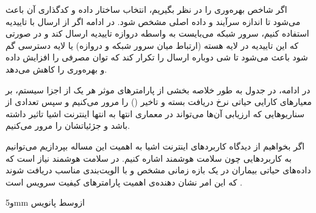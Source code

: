 اگر شاخص بهره‌وری را در نظر بگیریم، انتخاب ساختار داده و کدگذاری آن باعث می‌شود تا اندازه سرآیند و داده اصلی مشخص شود.
در ادامه اگر از ارسال با تاییدیه استفاده کنیم، سرور شبکه می‌بایست به واسطه دروازه تاییدیه ارسال کند و در صورتی
که این تاییدیه در لایه هسته (ارتباط میان سرور شبکه و دروازه) یا لایه دسترسی گم شود باعث می‌شود تا شی
دوباره ارسال را تکرار کند که توان مصرفی را افزایش داده و بهره‌وری را کاهش می‌دهد.

در ادامه، در جدول 
به طور خلاصه بخشی از پارامترهای موثر هر یک از اجزا سیستم،
بر معیارهای کارایی حیاتی نرخ دریافت بسته و تاخیر () را مرور می‌کنیم
و سپس تعدادی از سناریوهایی که ارزیابی آن‌ها می‌تواند در معماری انتها به انتها اینترنت اشیا تاثیر داشته باشد و جژئیاتشان را مرور می‌کنیم.

اگر بخواهیم از دیدگاه کاربردهای اینترنت اشیا به اهمیت این مساله بپردازیم می‌توانیم به کاربردهایی چون سلامت هوشمند اشاره کنیم.
در سلامت هوشمند نیاز است که داده‌های حیاتی بیماران در یک بازه زمانی مشخص و با الویت‌بندی مناسب دریافت شوند که این امر
نشان دهنده‌ی اهمیت پارامترهای کیفیت سرویس است .


‌و{5mm}
‌ازوسط
‌پانویس


